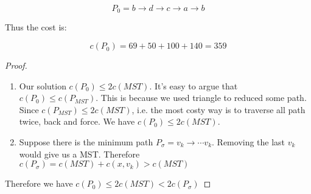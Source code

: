 $$ P_0 = b \rightarrow d \rightarrow c \rightarrow a \rightarrow b$$

Thus the cost is:

$$c(P_0) = 69+50+100+140 = 359$$

\begin{proof}
    \begin{enumerate}
        \item Our solution $c(P_0) \le 2 c(MST)$.
              It's easy to argue that $c(P_0) \le c(P_{MST})$.
              This is because we used triangle to reduced some path.
              Since $c(P_{MST}) \le 2c(MST)$, i.e. the most costy way is to traverse all path twice, back and force.
              We have $c(P_0) \le 2 c(MST)$.
        \item Suppose there is the minimum path $P_\sigma = v_k \rightarrow \cdots v_k$.
              Removing the last $v_k$ would give us a MST. Therefore $c(P_\sigma) = c(MST) + c(x, v_k) > c(MST)$
    \end{enumerate}
    Therefore we have $c(P_0) \le 2 c(MST) < 2c(P_\sigma)$
\end{proof}